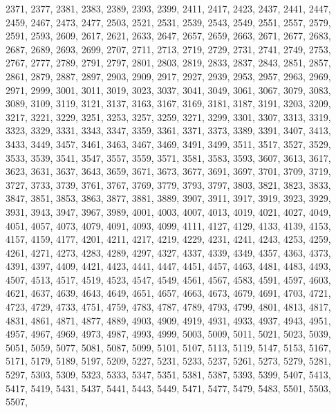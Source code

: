 \documentclass[landscape,twocolumn,a4paper]{article}
\begin{document}
 2371,  2377,  2381,  2383,  2389,  2393,  2399,  2411,  2417,  2423,  2437,  2441,  2447,  2459,
 2467,  2473,  2477,  2503,  2521,  2531,  2539,  2543,  2549,  2551,  2557,  2579,  2591,  2593,
 2609,  2617,  2621,  2633,  2647,  2657,  2659,  2663,  2671,  2677,  2683,  2687,  2689,  2693,
 2699,  2707,  2711,  2713,  2719,  2729,  2731,  2741,  2749,  2753,  2767,  2777,  2789,  2791,
 2797,  2801,  2803,  2819,  2833,  2837,  2843,  2851,  2857,  2861,  2879,  2887,  2897,  2903,
 2909,  2917,  2927,  2939,  2953,  2957,  2963,  2969,  2971,  2999,  3001,  3011,  3019,  3023,
 3037,  3041,  3049,  3061,  3067,  3079,  3083,  3089,  3109,  3119,  3121,  3137,  3163,  3167,
 3169,  3181,  3187,  3191,  3203,  3209,  3217,  3221,  3229,  3251,  3253,  3257,  3259,  3271,
 3299,  3301,  3307,  3313,  3319,  3323,  3329,  3331,  3343,  3347,  3359,  3361,  3371,  3373,
 3389,  3391,  3407,  3413,  3433,  3449,  3457,  3461,  3463,  3467,  3469,  3491,  3499,  3511,
 3517,  3527,  3529,  3533,  3539,  3541,  3547,  3557,  3559,  3571,  3581,  3583,  3593,  3607,
 3613,  3617,  3623,  3631,  3637,  3643,  3659,  3671,  3673,  3677,  3691,  3697,  3701,  3709,
 3719,  3727,  3733,  3739,  3761,  3767,  3769,  3779,  3793,  3797,  3803,  3821,  3823,  3833,
 3847,  3851,  3853,  3863,  3877,  3881,  3889,  3907,  3911,  3917,  3919,  3923,  3929,  3931,
 3943,  3947,  3967,  3989,  4001,  4003,  4007,  4013,  4019,  4021,  4027,  4049,  4051,  4057,
 4073,  4079,  4091,  4093,  4099,  4111,  4127,  4129,  4133,  4139,  4153,  4157,  4159,  4177,
 4201,  4211,  4217,  4219,  4229,  4231,  4241,  4243,  4253,  4259,  4261,  4271,  4273,  4283,
 4289,  4297,  4327,  4337,  4339,  4349,  4357,  4363,  4373,  4391,  4397,  4409,  4421,  4423,
 4441,  4447,  4451,  4457,  4463,  4481,  4483,  4493,  4507,  4513,  4517,  4519,  4523,  4547,
 4549,  4561,  4567,  4583,  4591,  4597,  4603,  4621,  4637,  4639,  4643,  4649,  4651,  4657,
 4663,  4673,  4679,  4691,  4703,  4721,  4723,  4729,  4733,  4751,  4759,  4783,  4787,  4789,
 4793,  4799,  4801,  4813,  4817,  4831,  4861,  4871,  4877,  4889,  4903,  4909,  4919,  4931,
 4933,  4937,  4943,  4951,  4957,  4967,  4969,  4973,  4987,  4993,  4999,  5003,  5009,  5011,
 5021,  5023,  5039,  5051,  5059,  5077,  5081,  5087,  5099,  5101,  5107,  5113,  5119,  5147,
 5153,  5167,  5171,  5179,  5189,  5197,  5209,  5227,  5231,  5233,  5237,  5261,  5273,  5279,
 5281,  5297,  5303,  5309,  5323,  5333,  5347,  5351,  5381,  5387,  5393,  5399,  5407,  5413,
 5417,  5419,  5431,  5437,  5441,  5443,  5449,  5471,  5477,  5479,  5483,  5501,  5503,  5507,
\end{document}
